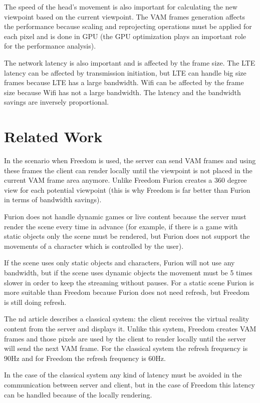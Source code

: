 \documentclass[conference]{IEEEtran}
\begin{document}
The speed of the head's movement is also important for calculating the new viewpoint based on the current viewpoint. The VAM frames generation affects the performance because scaling and reprojecting operations must be applied for each pixel and is done in GPU (the GPU optimization plays an important role for the performance analysis).

The network latency is also important and is affected by the frame size. The LTE latency can be affected by transmission initiation, but LTE can handle big size frames because LTE has a large bandwidth. Wifi can be affected by the frame size because Wifi has not a large bandwidth. The latency and the bandwidth savings are inversely proportional. 

\section*{Related Work}

In the scenario when Freedom is used, the server can send VAM frames and using these frames the client can render locally until the viewpoint is not placed in the current VAM frame area anymore. Unlike Freedom Furion \cite{b1} creates a 360 degree view for each potential viewpoint (this is why Freedom is far better than Furion in terms of bandwidth savings).

Furion does not handle dynamic games or live content because the server must render the scene every time in advance (for example, if there is a game with static objects only the scene must be rendered, but Furion does not support the movements of a character which is controlled by the user).

If the scene uses only static objects and characters, Furion will not use any bandwidth, but if the scene uses dynamic objects the movement must be 5 times slower in order to keep the streaming without pauses. For a static scene Furion is more suitable than Freedom because Furion does not need refresh, but Freedom is still doing refresh.

The \cite{b2}nd article describes a classical system: the client receives the virtual reality content from the server and displays it. Unlike this system, Freedom creates VAM frames and those pixels are used by the client to render locally until the server will send the next VAM frame. For the classical system the refresh frequency is 90Hz and for Freedom the refresh frequency is 60Hz.

In the case of the classical system any kind of latency must be avoided in the communication between server and client, but in the case of Freedom this latency can be handled because of the locally rendering.
\end{document}
